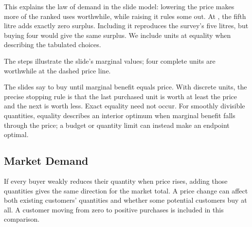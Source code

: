 This explains the law of demand in the slide model: lowering the price
makes more of the ranked uses worthwhile, while raising it rules some out.
At , the fifth litre adds exactly zero surplus. Including it
reproduces the survey's five litres, but buying four would give the same
surplus. We include units at equality when describing the tabulated choices.

\begin{center}
\end{center}
The steps illustrate the slide's marginal values; four complete units
are worthwhile at the dashed price line.

The slides say to buy until marginal benefit equals price. With discrete
units, the precise stopping rule is that the last purchased unit is worth
at least the price and the next is worth less. Exact equality need not
occur. For smoothly divisible quantities, equality describes an interior
optimum when marginal benefit falls through the price; a budget or quantity
limit can instead make an endpoint optimal.

\subsection{Market Demand}
If every buyer weakly reduces their quantity when price rises, adding
those quantities gives the same direction for the market total. A price
change can affect both existing customers' quantities and whether some
potential customers buy at all. A customer moving from zero to positive
purchases is included in this comparison.

